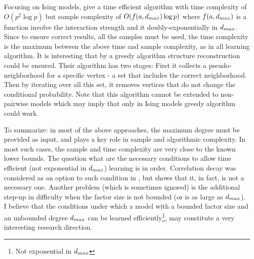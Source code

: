 Focusing on Ising models,  \cite{bresler2015efficiently} give a time efficient algorithm with time complexity of $O(p^2\log p)$ but sample complexity of $O( f(a,d_{max}) \log p)$ where $f(a,d_{max})$ is a function involve the interaction strength and it doubly-exponentially in $d_{max}$.
Since to ensure correct results, all the samples must be used, the time complexity is the maximum between the above time and sample complexity, as in all learning algorithm. 
It is interesting that by a greedy algorithm structure reconstruction could be ensured.
Their algorithm has two stages: First it collects a pseudo-neighborhood for a specific vertex - a set that includes the correct neighborhood.
Then by iterating over all this set, it removes vertices that do not change the conditional probability.
Note that this algorithm cannot be extended to non-pairwise models which may imply that only in Ising models greedy algorithm could work.

To summarize: in most of the above approaches, the maximum degree must be provided as input, and plays a key role in sample and algorithmic complexity.
In most such cases, the sample and time complexity are very close to the known lower bounds.
The question what are the necessary conditions to allow time efficient (not exponential in $d_{max}$) learning is in order.
Correlation decay was considered as an option to such condition in \cite{montanari2009graphical}, but \cite{bresler2014structure} shows that it, in fact, is not a necessary one.
Another problem (which is sometimes ignored) is the additional step-up in difficulty when the factor size is not bounded (or is as large as $d_{max}$). 
I believe that the conditions under which a model with a bounded factor size and an unbounded degree $d_{max}$ can be learned efficiently\footnote{Not exponential in $d_{max}$}, may constitute a very interesting research direction.
